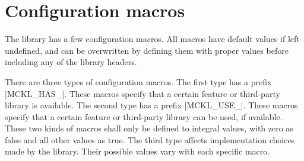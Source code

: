 %
%
%
%

\chapter{Configuration macros}
\label{chap:Configuration macros}

The library has a few configuration macros. All macros have default values if
left undefined, and can be overwritten by defining them with proper values
before including any of the library headers.

There are three types of configuration macros. The first type has a prefix
|MCKL_HAS_|. These macros specify that a certain feature or third-party library
is available. The second type has a prefix |MCKL_USE_|. These macros specify
that a certain feature or third-party library can be used, if available. These
two kinds of macros shall only be defined to integral values, with zero as
false and all other values as true. The third type affects implementation
choices made by the library. Their possible values vary with each specific
macro.

